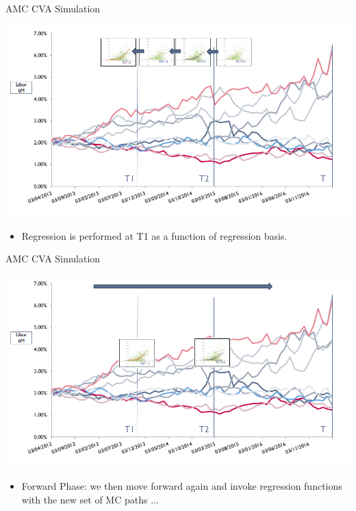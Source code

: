 \documentclass[11pt]{beamer}
\begin{document}
\begin{frame}{AMC CVA Simulation}
\begin{center}
\includegraphics[scale=.4]{img/AMC7.PNG} 
\end{center}
\begin{itemize}
\scriptsize
\item  Regression is performed at T1 as a function of regression basis. 
\normalsize
\end{itemize}
\end{frame}
\begin{frame}{AMC CVA Simulation}
\begin{center}
\includegraphics[scale=.4]{img/AMC8.PNG} 
\end{center}
\begin{itemize}
\scriptsize
\item Forward Phase: we then move forward again and invoke regression functions with the new set of MC paths ... 
\normalsize
\end{itemize}
\end{frame}
\end{document}
